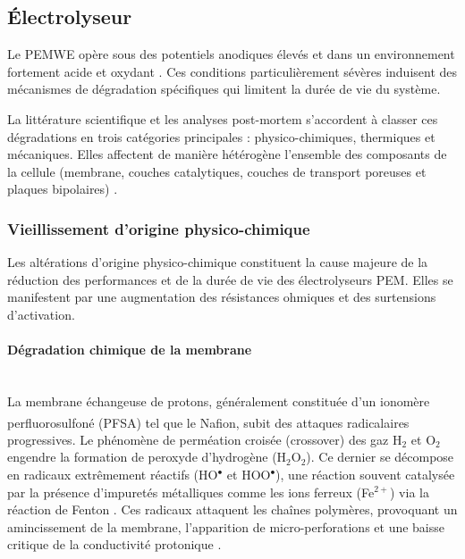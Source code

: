 \subsection{Électrolyseur}
Le PEMWE opère sous des potentiels anodiques élevés et dans un environnement fortement acide et oxydant \cite{carmo_comprehensive_2013}\cite{shirvanian_novel_2020}. Ces conditions particulièrement sévères induisent des mécanismes de dégradation spécifiques qui limitent la durée de vie du système. 

La littérature scientifique et les analyses post-mortem s'accordent à classer ces dégradations en trois catégories principales : physico-chimiques, thermiques et mécaniques. Elles affectent de manière hétérogène l'ensemble des composants de la cellule (membrane, couches catalytiques, couches de transport poreuses et plaques bipolaires) \cite{feng_review_2017}\cite{wallnofer-ogris_review_2024}\cite{norazahar_degradation_2024}.

\subsubsection{Vieillissement d'origine physico-chimique}

Les altérations d'origine physico-chimique constituent la cause majeure de la réduction des performances et de la durée de vie des électrolyseurs PEM. Elles se manifestent par une augmentation des résistances ohmiques et des surtensions d'activation.

\paragraph{Dégradation chimique de la membrane}\hfill \\
La membrane échangeuse de protons, généralement constituée d'un ionomère perfluorosulfoné (PFSA) tel que le Nafion\textsuperscript{\textregistered}, subit des attaques radicalaires progressives. Le phénomène de perméation croisée (crossover) des gaz H$_2$ et O$_2$ engendre la formation de peroxyde d'hydrogène (H$_2$O$_2$). Ce dernier se décompose en radicaux extrêmement réactifs (HO$^\bullet$ et HOO$^\bullet$), une réaction souvent catalysée par la présence d'impuretés métalliques comme les ions ferreux (Fe$^{2+}$) via la réaction de Fenton \cite{chandesris_membrane_2015}\cite{frensch_impact_2019}. Ces radicaux attaquent les chaînes polymères, provoquant un amincissement de la membrane, l'apparition de micro-perforations et une baisse critique de la conductivité protonique \cite{kuhnert_analysis_2023}.

